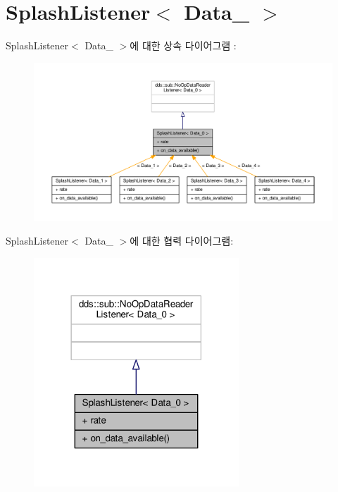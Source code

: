\hypertarget{classSplashListener}{}\section{Splash\+Listener$<$ Data\+\_ $>$}
\label{classSplashListener}


Splash\+Listener$<$ Data\+\_ $>$에 대한 상속 다이어그램 \+: \nopagebreak
\begin{figure}[H]
\begin{center}
\leavevmode
\includegraphics[width=350pt]{classSplashListener__inherit__graph}
\end{center}
\end{figure}


Splash\+Listener$<$ Data\+\_ $>$에 대한 협력 다이어그램\+:\nopagebreak
\begin{figure}[H]
\begin{center}
\leavevmode
\includegraphics[width=218pt]{classSplashListener__coll__graph}
\end{center}
\end{figure}
